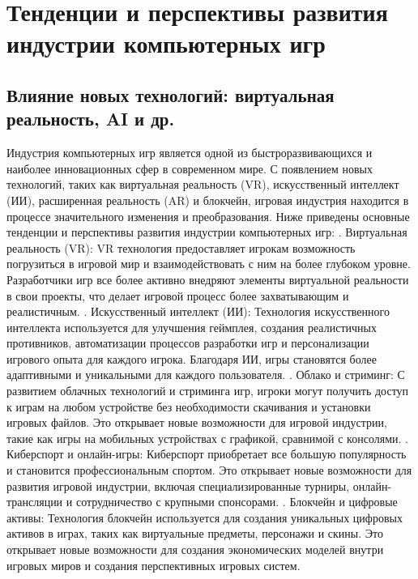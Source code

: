 \section{Тенденции и перспективы развития индустрии компьютерных игр}
\subsection{Влияние новых технологий: виртуальная реальность, AI и др.}

Индустрия компьютерных игр является одной из быстроразвивающихся и наиболее инновационных сфер в современном мире. С появлением новых технологий, таких как виртуальная реальность (VR), искусственный интеллект (ИИ), расширенная реальность (AR) и блокчейн, игровая индустрия находится в процессе значительного изменения и преобразования. Ниже приведены основные тенденции и перспективы развития индустрии компьютерных игр:
. Виртуальная реальность (VR): VR технология предоставляет игрокам возможность погрузиться в игровой мир и взаимодействовать с ним на более глубоком уровне. Разработчики игр все более активно внедряют элементы виртуальной реальности в свои проекты, что делает игровой процесс более захватывающим и реалистичным.
. Искусственный интеллект (ИИ): Технология искусственного интеллекта используется для улучшения геймплея, создания реалистичных противников, автоматизации процессов разработки игр и персонализации игрового опыта для каждого игрока. Благодаря ИИ, игры становятся более адаптивными и уникальными для каждого пользователя.
. Облако и стриминг: С развитием облачных технологий и стриминга игр, игроки могут получить доступ к играм на любом устройстве без необходимости скачивания и установки игровых файлов. Это открывает новые возможности для игровой индустрии, такие как игры на мобильных устройствах с графикой, сравнимой с консолями.
. Киберспорт и онлайн-игры: Киберспорт приобретает все большую популярность и становится профессиональным спортом. Это открывает новые возможности для развития игровой индустрии, включая специализированные турниры, онлайн-трансляции и сотрудничество с крупными спонсорами.
. Блокчейн и цифровые активы: Технология блокчейн используется для создания уникальных цифровых активов в играх, таких как виртуальные предметы, персонажи и скины. Это открывает новые возможности для создания экономических моделей внутри игровых миров и создания перспективных игровых систем.

